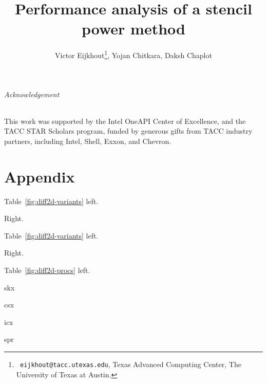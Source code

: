 \documentclass[11pt,fleqn]{artikel3}
\begin{document}
\title{Performance analysis of a stencil power method}
\author{Victor Eijkhout\thanks{{\tt
      eijkhout@tacc.utexas.edu}, Texas Advanced Computing Center, The
    University of Texas at Austin.
  }, Yojan Chitkara, Daksh Chaplot}
\maketitle



\paragraph*{Acknowledgement}
This work was supported by
the Intel OneAPI Center of Excellence, and the 
TACC STAR Scholars program,
funded by generous gifts from TACC industry partners, including Intel, Shell, Exxon, and Chevron.

\part{Appendix}

Table~\ref{fig:diff2d-variants} left.



Right.



Table~\ref{fig:diff2d-variants} left.



Right.



Table~\ref{fig:diff2d-procs} left.

skx



csx



icx



spr


\end{document}
